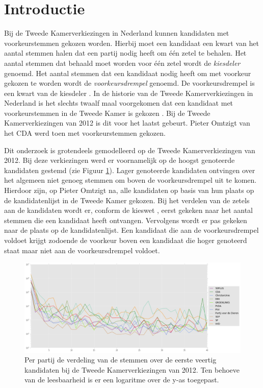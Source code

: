 \section{Introductie}
\label{sec:intro}
Bij de Tweede Kamerverkiezingen in Nederland kunnen kandidaten met voorkeurstemmen gekozen worden. Hierbij moet een kandidaat een kwart van het aantal stemmen halen dat een partij nodig heeft om één zetel te behalen. Het aantal stemmen dat behaald moet worden voor één zetel wordt de \textit{kiesdeler} genoemd. Het aantal stemmen dat een kandidaat nodig heeft om met voorkeur gekozen te worden wordt de \textit{voorkeursdrempel} genoemd. De voorkeursdrempel is een kwart van de kiesdeler  \citep{Kiesraad_voorkeursdrempel2}.  In de historie van de Tweede Kamerverkiezingen in Nederland is het slechts twaalf maal voorgekomen dat een kandidaat met voorkeurstemmen in de Tweede Kamer is gekozen \citep{Voork74:online}. Bij de Tweede Kamerverkiezingen van 2012 is dit voor het laatst gebeurt. Pieter Omtzigt van het CDA werd toen met voorkeurstemmen gekozen.\

Dit onderzoek is grotendeels gemodelleerd op de Tweede Kamerverkiezingen van 2012. Bij deze verkiezingen werd er voornamelijk op de hoogst genoteerde kandidaten gestemd (zie Figuur \ref{fig:sv2012}). Lager genoteerde kandidaten ontvingen over het algemeen niet genoeg stemmen om boven de voorkeursdrempel uit te komen. Hierdoor zijn, op Pieter Omtzigt na, alle kandidaten op basis van hun plaats op de kandidatenlijst in de Tweede Kamer gekozen. Bij het verdelen van de zetels aan de kandidaten wordt er, conform de kieswet \citeyearpar{kieswetje}, eerst gekeken naar het aantal stemmen die een kandidaat heeft ontvangen. Vervolgens wordt er pas gekeken naar de plaats op de kandidatenlijst. Een kandidaat die aan de voorkeursdrempel voldoet krijgt zodoende de voorkeur boven een kandidaat die hoger genoteerd staat maar niet aan de voorkeursdrempel voldoet. 


\begin{figure}[H]


	\includegraphics[width=\linewidth]{verdeling_stemmen_2012.png}

			\caption{Per partij de verdeling van de stemmen over de eerste veertig kandidaten bij de Tweede Kamerverkiezingen van 2012. Ten behoeve van de leesbaarheid is er een logaritme over de y-as toegepast.}

\label{fig:sv2012}
\end{figure}


